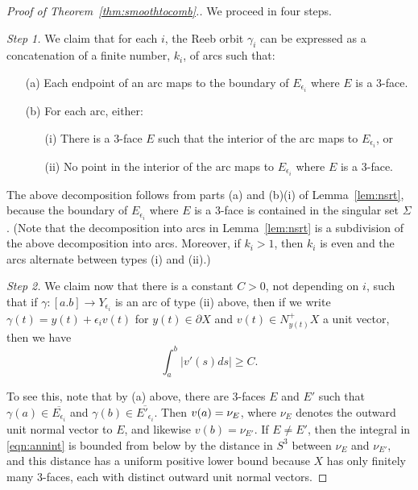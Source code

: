 \begin{proof}[Proof of Theorem~\ref{thm:smoothtocomb}.]
We proceed in four steps.

{\em Step 1.\/}
We claim that for each $i$, the Reeb orbit $\gamma_i$ can be expressed as a concatenation of a finite number, $k_i$, of arcs such that:
\begin{itemize}
\item[(a)]
Each endpoint of an arc maps to the boundary of $E_{\epsilon_i}$ where $E$ is a $3$-face. 
\item[(b)]
For each arc, either:
\begin{itemize}
\item[(i)] There is a $3$-face $E$ such that the interior of the arc maps to $E_{\epsilon_i}$, or
\item[(ii)] No point in the interior of the arc maps to $E_{\epsilon_i}$ where $E$ is a $3$-face.
\end{itemize}
\end{itemize}

The above decomposition follows from parts (a) and (b)(i) of Lemma~\ref{lem:nsrt}, because the boundary of $E_{\epsilon_i}$ where $E$ is a $3$-face is contained in the singular set $\Sigma$. (Note that the decomposition into arcs in Lemma~\ref{lem:nsrt} is a subdivision of the above decomposition into arcs. Moreover, if $k_i>1$, then $k_i$ is even and the arcs alternate between types (i) and (ii).)

{\em Step 2.\/}
We claim now that there is a constant $C>0$, not depending on $i$, such that if $\gamma:[a.b]\to Y_{\epsilon_i}$ is an arc of type (ii) above, then if we write $\gamma(t)=y(t)+\epsilon_iv(t)$ for $y(t)\in\partial X$ and $v(t)\in N_{y(t)}^+X$ a unit vector, then we have
\begin{equation}
\label{eqn:annint}
\int_a^b|v'(s)ds|\ge C.
\end{equation}

To see this, note that by (a) above, there are 3-faces $E$ and $E'$ such that $\gamma(a)\in\overline{E_{\epsilon_i}}$ and $\gamma(b)\in\overline{E'_{\epsilon_i}}$. Then $v(a)=\nu_E$, where $\nu_E$ denotes the outward unit normal vector to $E$, and likewise $v(b)=\nu_{E'}$. If $E\neq E'$, then the integral in \eqref{eqn:annint} is bounded from below by the distance in $S^3$ between $\nu_E$ and $\nu_{E'}$, and this distance has a uniform positive lower bound because $X$ has only finitely many $3$-faces, each with distinct outward unit normal vectors.


\end{proof}
